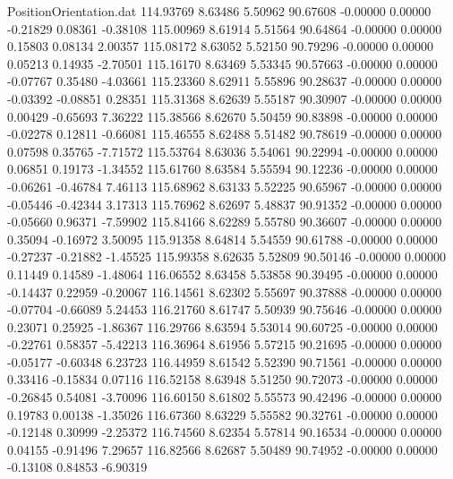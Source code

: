 \begin{filecontents}{PositionOrientation.dat}
 114.93769    8.63486    5.50962    90.67608   -0.00000    0.00000   -0.21829    0.08361   -0.38108
 115.00969    8.61914    5.51564    90.64864   -0.00000    0.00000    0.15803    0.08134    2.00357
 115.08172    8.63052    5.52150    90.79296   -0.00000    0.00000    0.05213    0.14935   -2.70501
 115.16170    8.63469    5.53345    90.57663   -0.00000    0.00000   -0.07767    0.35480   -4.03661
 115.23360    8.62911    5.55896    90.28637   -0.00000    0.00000   -0.03392   -0.08851    0.28351
 115.31368    8.62639    5.55187    90.30907   -0.00000    0.00000    0.00429   -0.65693    7.36222
 115.38566    8.62670    5.50459    90.83898   -0.00000    0.00000   -0.02278    0.12811   -0.66081
 115.46555    8.62488    5.51482    90.78619   -0.00000    0.00000    0.07598    0.35765   -7.71572
 115.53764    8.63036    5.54061    90.22994   -0.00000    0.00000    0.06851    0.19173   -1.34552
 115.61760    8.63584    5.55594    90.12236   -0.00000    0.00000   -0.06261   -0.46784    7.46113
 115.68962    8.63133    5.52225    90.65967   -0.00000    0.00000   -0.05446   -0.42344    3.17313
 115.76962    8.62697    5.48837    90.91352   -0.00000    0.00000   -0.05660    0.96371   -7.59902
 115.84166    8.62289    5.55780    90.36607   -0.00000    0.00000    0.35094   -0.16972    3.50095
 115.91358    8.64814    5.54559    90.61788   -0.00000    0.00000   -0.27237   -0.21882   -1.45525
 115.99358    8.62635    5.52809    90.50146   -0.00000    0.00000    0.11449    0.14589   -1.48064
 116.06552    8.63458    5.53858    90.39495   -0.00000    0.00000   -0.14437    0.22959   -0.20067
 116.14561    8.62302    5.55697    90.37888   -0.00000    0.00000   -0.07704   -0.66089    5.24453
 116.21760    8.61747    5.50939    90.75646   -0.00000    0.00000    0.23071    0.25925   -1.86367
 116.29766    8.63594    5.53014    90.60725   -0.00000    0.00000   -0.22761    0.58357   -5.42213
 116.36964    8.61956    5.57215    90.21695   -0.00000    0.00000   -0.05177   -0.60348    6.23723
 116.44959    8.61542    5.52390    90.71561   -0.00000    0.00000    0.33416   -0.15834    0.07116
 116.52158    8.63948    5.51250    90.72073   -0.00000    0.00000   -0.26845    0.54081   -3.70096
 116.60150    8.61802    5.55573    90.42496   -0.00000    0.00000    0.19783    0.00138   -1.35026
 116.67360    8.63229    5.55582    90.32761   -0.00000    0.00000   -0.12148    0.30999   -2.25372
 116.74560    8.62354    5.57814    90.16534   -0.00000    0.00000    0.04155   -0.91496    7.29657
 116.82566    8.62687    5.50489    90.74952   -0.00000    0.00000   -0.13108    0.84853   -6.90319

\end{filecontents}
